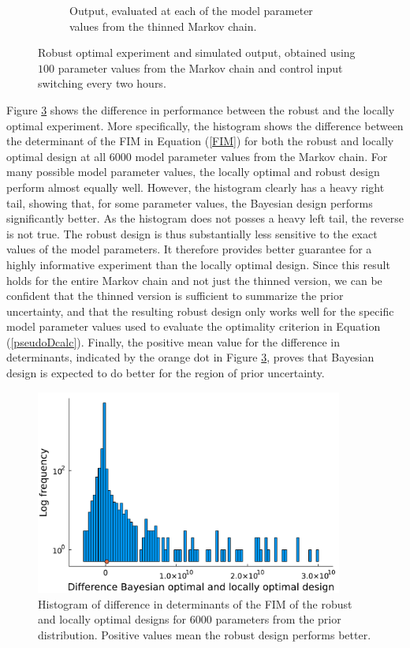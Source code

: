 \begin{figure}[H]
\begin{subfigure}{0.45\textwidth}
		\caption{Output, evaluated at each of the model parameter values from the thinned Markov chain.}
		\label{figbayesianc}
	\end{subfigure}
	\caption{Robust optimal experiment and simulated output, obtained using $100$ parameter values from the Markov chain and control input switching every two hours.}
	\label{figbayesian}
\end{figure}
Figure \ref{figbayesianhistogram} shows the difference in performance between the robust and the locally optimal experiment. More specifically, the histogram shows the difference between the determinant of the FIM in Equation (\ref{FIM}) for both the robust and locally optimal design at all $6000$ model parameter values from the Markov chain. For many possible model parameter values, the locally optimal and robust design perform almost equally well. However, the histogram clearly has a heavy right tail, showing that, for some parameter values, the Bayesian design performs significantly better. As the histogram does not posses a heavy left tail, the reverse is not true. The robust design is thus substantially less sensitive to the exact values of the model parameters. It therefore provides better guarantee for a highly informative experiment than the locally optimal design. Since this result holds for the entire Markov chain and not just the thinned version, we can be confident that the thinned version is sufficient to summarize the prior uncertainty, and that the resulting robust design only works well for the specific model parameter values used to evaluate the optimality criterion in Equation (\ref{pseudoDcalc}). Finally, the positive mean value for the difference in determinants, indicated by the orange dot in Figure \ref{figbayesianhistogram}, proves that Bayesian design is expected to do better for the region of prior uncertainty.
\begin{figure}[H]
	\centering
	\includegraphics[width=0.9\textwidth]{figure/paper 2/histogram.pdf}
	\caption{Histogram of difference in determinants of the FIM of the robust and locally optimal designs for $6000$ parameters from the prior distribution. Positive values mean the robust design performs better.}
	\label{figbayesianhistogram}
\end{figure}
